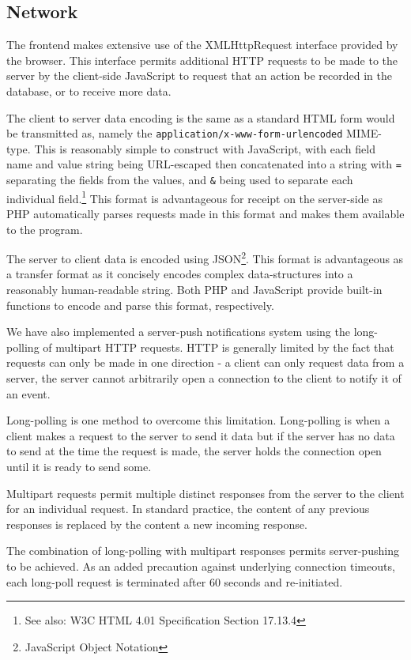 \documentclass[12pt]{amsart}
\begin{document}
  \subsection{Network}
    \begin{flushleft}
      The frontend makes extensive use of the XMLHttpRequest interface provided 
      by the browser. This interface permits additional HTTP requests to be made 
      to the server by the client-side JavaScript to request that an action be 
      recorded in the database, or to receive more data.

      The client to server data encoding is the same as a standard HTML form 
      would be transmitted as, namely the 
      \verb|application/x-www-form-urlencoded| MIME-type. This is reasonably 
      simple to construct with JavaScript, with each field name and value
      string being URL-escaped then concatenated into a string with \verb|=| 
      separating the fields from the values, and \verb|&| being used to separate 
      each individual field.\footnote{See also: W3C HTML 4.01 Specification Section 
      17.13.4} This format is advantageous for receipt on the server-side as PHP 
      automatically parses requests made in this format and makes them available
      to the program.

      The server to client data is encoded using JSON\footnote{JavaScript Object 
      Notation}. This format is advantageous as a transfer format as it 
      concisely encodes complex data-structures into a reasonably human-readable 
      string. Both PHP and JavaScript provide built-in functions to encode and 
      parse this format, respectively.

      We have also implemented a server-push notifications system using the 
      long-polling of multipart HTTP requests. HTTP is generally limited by the 
      fact that requests can only be made in one direction - a client can only 
      request data from a server, the server cannot arbitrarily open a 
      connection to the client to notify it of an event.
      
      Long-polling is one 
      method to overcome this limitation. Long-polling is when a client makes a 
      request to the server to send it data but if the server has no data to 
      send at the time the request is made, the server holds the connection open 
      until it is ready to send some.
      
      Multipart requests permit multiple distinct responses from the server to 
      the client for an individual request. In standard practice, the content of 
      any previous responses is replaced by the content a new incoming response.

      The combination of long-polling with multipart responses permits 
      server-pushing to be achieved. As an added precaution against underlying 
      connection timeouts, each long-poll request is terminated after 60 seconds 
      and re-initiated.
    \end{flushleft}
\end{document}

